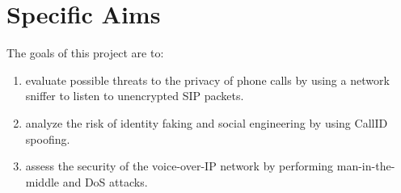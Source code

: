 \section{Specific Aims}
\label{sec:aim}

The goals of this project are to:

\begin{enumerate}
\item evaluate possible threats to the privacy of phone calls by using a network sniffer to listen to unencrypted SIP packets.
\item analyze the risk of identity faking and social engineering by using CallID spoofing.
\item assess the security of the voice-over-IP network by performing man-in-the-middle and DoS attacks.
\end{enumerate}